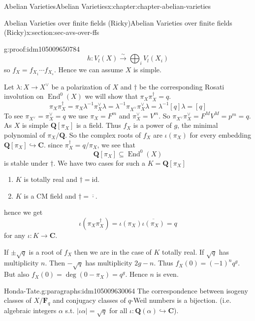 \documentclass[oneside,10pt,]{book}
\numberwithin{equation}{section}
\newcommand{\lb}{[}
\newcommand{\rb}{]}
\newcommand{\QQ}{\mathbf{Q}}
\newcommand{\CC}{\mathbf{C}}
\newcommand{\FF}{\mathbf{F}}
\newcommand{\id}{\mathrm{id}}
\DeclareMathOperator{\End}{End}
\begin{document}
\begin{chapterptx}{Abelian Varieties}{}{Abelian Varieties}{}{}{x:chapter:chapter-abelian-varieties}
\begin{sectionptx}{Abelian Varieties over finite fields (Ricky)}{}{Abelian Varieties over finite fields (Ricky)}{}{}{x:section:sec-avs-over-ffs}
\begin{proofptx}{}{g:proof:idm105009650784}
\begin{equation*}
h\colon V_l(X)\xrightarrow{\sim} \bigoplus_i V_l(X_i)
\end{equation*}
so \(f_X = f_{X_1} \cdots f_{X_s}\). Hence we can assume \(X\) is simple.%
\par
Let \(\lambda \colon X \to X^\vee\) be a polarization of \(X\) and \(\dagger\) be the corresponding Rosati involution on \(\End^0(X)\) we will show that \(\pi_X\pi_X^\dagger = q\).%
\begin{equation*}
\pi_X \pi_X^\dagger = \pi_X \lambda^{-1} \pi_X^\vee \lambda = \lambda^{-1} \pi_{X^\vee} \pi_X^\vee \lambda = \lambda^{-1} \lb q \rb \lambda = \lb q \rb
\end{equation*}
To see \(\pi_{X^\vee} = \pi_X^\vee = q\) we use \(\pi_X = F^m\) and \(\pi_X^\vee = V^m \). So \(\pi_{X^\vee} \pi_X^\vee = F^MV^M = p^m = q\). As \(X\) is simple \(\QQ\lb \pi_X\rb\) is a field. Thus \(f_X\) is a power of \(g\), the minimal polynomial of \(\pi_X/\QQ\). So the complex roots of \(f_X\) are \(\iota(\pi_X)\)  for every embedding \(\QQ\lb \pi_X\rb\hookrightarrow \CC\). since \(\pi_X^\dagger = q/ \pi_X\), we see that%
\begin{equation*}
\QQ[\pi_X] \subseteq \End^0(X)
\end{equation*}
is stable under \(\dagger\). We have two cases for such a \(K = \QQ\lb \pi_X \rb \)%
\begin{enumerate}
\item{}\(K\) is  totally real and \(\dagger = \id\).%
\item{}\(K\) is a CM field and \(\dagger = \overline{\cdot}\).%
\end{enumerate}
hence we get%
\begin{equation*}
\iota(\pi_X\pi_X^\dagger) = \iota(\pi_X) \overline{\iota(\pi_X)} = q
\end{equation*}
for any \(\iota\colon K \to \CC\).%
\par
If \(\pm \sqrt q\) is  a root  of  \(f_X\) then we are in the case of \(K\) totally real. If \(\sqrt q\) has multiplicity \(n\). Then \(-\sqrt q\) has multiplicity \(2g-n\). Thus \(f_X(0) = (-1)^n   q^g\). But also \(f_X(0 ) = \deg(0 - \pi_X) = q^g\). Hence \(n \) is even.%
\end{proofptx}
\begin{paragraphs}{Honda-Tate.}{g:paragraphs:idm105009630064}%
The correspondence between isogeny classes of \(X/\FF_q\) and conjugacy classes of \(q\)-Weil numbers is a bijection. (i.e. algebraic integers \(\alpha\) s.t. \(|\iota \alpha| = \sqrt q\) for all \(\iota \colon \QQ(\alpha) \hookrightarrow \CC\)).%

\end{paragraphs}
\end{sectionptx}
\end{chapterptx}
\end{document}
